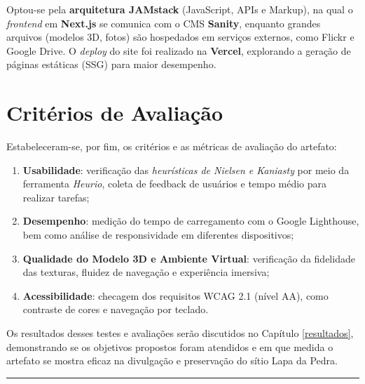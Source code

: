 Optou-se pela \textbf{arquitetura JAMstack} (JavaScript, APIs e Markup), na qual o \textit{frontend} em \textbf{Next.js} se comunica com o CMS \textbf{Sanity}, enquanto grandes arquivos (modelos 3D, fotos) são hospedados em serviços externos, como Flickr e Google Drive. O \textit{deploy} do site foi realizado na \textbf{Vercel}, explorando a geração de páginas estáticas (SSG) para maior desempenho.

\section{Critérios de Avaliação}
\label{sec:criterios_avaliacao}

Estabeleceram-se, por fim, os critérios e as métricas de avaliação do artefato:

\begin{enumerate}
    \item \textbf{Usabilidade}: verificação das \textit{heurísticas de Nielsen e Kaniasty} por meio da ferramenta \textit{Heurio}, coleta de feedback de usuários e tempo médio para realizar tarefas;
    \item \textbf{Desempenho}: medição do tempo de carregamento com o Google Lighthouse, bem como análise de responsividade em diferentes dispositivos;
    \item \textbf{Qualidade do Modelo 3D e Ambiente Virtual}: verificação da fidelidade das texturas, fluidez de navegação e experiência imersiva;
    \item \textbf{Acessibilidade}: checagem dos requisitos WCAG 2.1 (nível AA), como contraste de cores e navegação por teclado.
\end{enumerate}

Os resultados desses testes e avaliações serão discutidos no Capítulo \ref{resultados}, demonstrando se os objetivos propostos foram atendidos e em que medida o artefato se mostra eficaz na divulgação e preservação do sítio Lapa da Pedra.

\noindent\rule{12cm}{0.4pt}
